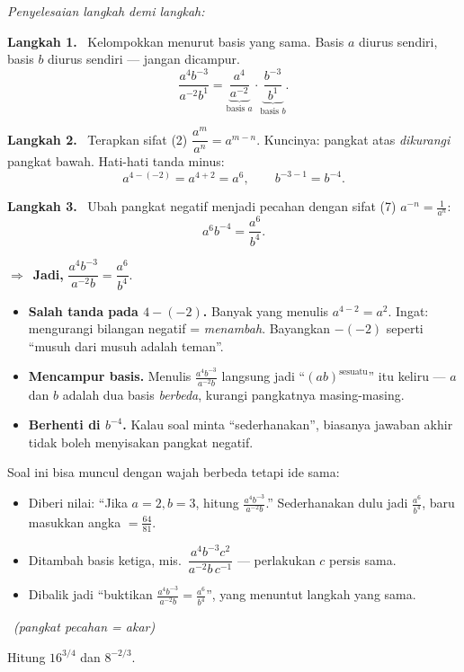 \documentclass[11pt,a4paper]{report}
\theoremstyle{gaya}
\newcommand{\jawab}{\par\smallskip\noindent\textit{\textcolor{oranye}{Penyelesaian langkah demi langkah:}}\par\smallskip}
\newcommand{\langkah}[1]{\par\smallskip\noindent\textbf{\textcolor{biru}{Langkah #1.}}\ }
\newcommand{\jadi}{\par\smallskip\noindent$\Rightarrow$\ \textbf{Jadi, }}
\newcommand{\soalno}[2]{%
  \par\bigskip
  \noindent{\large\bfseries\color{ungu}\rule[-2pt]{4pt}{14pt}\ Soal #1}%
  \ {\normalfont\itshape\color{gray}(#2)}\par\nopagebreak\smallskip}
\begin{document}
\jawab
\langkah{1} Kelompokkan menurut basis yang sama. Basis $a$ diurus sendiri, basis
$b$ diurus sendiri --- jangan dicampur.
\[
\frac{a^4 b^{-3}}{a^{-2} b^{1}} = \underbrace{\frac{a^4}{a^{-2}}}_{\text{basis }a} \cdot \underbrace{\frac{b^{-3}}{b^{1}}}_{\text{basis }b}.
\]
\langkah{2} Terapkan sifat (2) $\dfrac{a^m}{a^n}=a^{m-n}$. Kuncinya: pangkat atas
\emph{dikurangi} pangkat bawah. Hati-hati tanda minus:
\[
a^{4-(-2)} = a^{4+2} = a^{6}, \qquad b^{-3-1} = b^{-4}.
\]
\langkah{3} Ubah pangkat negatif menjadi pecahan dengan sifat (7)
$a^{-n}=\frac{1}{a^n}$:
\[
a^6 b^{-4} = \frac{a^6}{b^4}.
\]
\jadi $\dfrac{a^4 b^{-3}}{a^{-2}b} = \dfrac{a^6}{b^4}$.

\begin{jebakan}
\begin{itemize}[leftmargin=*,topsep=2pt]
  \item \textbf{Salah tanda pada $4-(-2)$.} Banyak yang menulis $a^{4-2}=a^2$.
  Ingat: mengurangi bilangan negatif = \emph{menambah}. Bayangkan $-(-2)$ seperti
  ``musuh dari musuh adalah teman''.
  \item \textbf{Mencampur basis.} Menulis $\frac{a^4 b^{-3}}{a^{-2}b}$ langsung
  jadi ``$(ab)^{\text{sesuatu}}$'' itu keliru --- $a$ dan $b$ adalah dua basis
  \emph{berbeda}, kurangi pangkatnya masing-masing.
  \item \textbf{Berhenti di $b^{-4}$.} Kalau soal minta ``sederhanakan'',
  biasanya jawaban akhir tidak boleh menyisakan pangkat negatif.
\end{itemize}
\end{jebakan}

\begin{variasi}
Soal ini bisa muncul dengan wajah berbeda tetapi ide sama:
\begin{itemize}[leftmargin=*,topsep=2pt]
  \item Diberi nilai: ``Jika $a=2,b=3$, hitung $\frac{a^4b^{-3}}{a^{-2}b}$.''
  Sederhanakan dulu jadi $\frac{a^6}{b^4}$, baru masukkan angka $=\frac{64}{81}$.
  \item Ditambah basis ketiga, mis.\ $\dfrac{a^4 b^{-3} c^2}{a^{-2} b\, c^{-1}}$
  --- perlakukan $c$ persis sama.
  \item Dibalik jadi ``buktikan $\frac{a^4b^{-3}}{a^{-2}b}=\frac{a^6}{b^4}$'',
  yang menuntut langkah yang sama.
\end{itemize}
\end{variasi}

\soalno{1.1.2}{pangkat pecahan = akar}
\begin{soalbox}{}
Hitung $16^{3/4}$ dan $8^{-2/3}$.
\end{soalbox}
\end{document}

